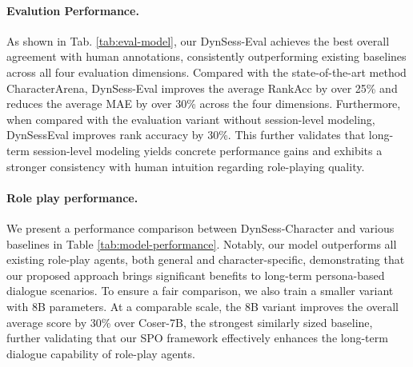 \paragraph{Evalution Performance.}As shown in Tab. \ref{tab:eval-model}, our DynSess-Eval achieves the best overall agreement with human annotations, consistently outperforming existing baselines across all four evaluation dimensions. Compared with the state-of-the-art method CharacterArena, DynSess-Eval improves the average RankAcc by over 25\% and reduces the average MAE by over 30\% across the four dimensions. Furthermore, when compared with the evaluation variant without session-level modeling, DynSessEval improves rank accuracy by 30\%. This further validates that long-term session-level modeling yields concrete performance gains and exhibits a stronger consistency with human intuition regarding role-playing quality.





\paragraph{Role play performance.} We present a performance comparison between DynSess-Character and various baselines in Table \ref{tab:model-performance}. Notably, our model outperforms all existing role-play agents, both general and character-specific, demonstrating that our proposed approach brings significant benefits to long-term persona-based dialogue scenarios. To ensure a fair comparison, we also train a smaller variant with 8B parameters. At a comparable scale, the 8B variant improves the overall average score by 30\% over Coser-7B, the strongest similarly sized baseline, further validating that our SPO framework effectively enhances the long-term dialogue capability of role-play agents.









